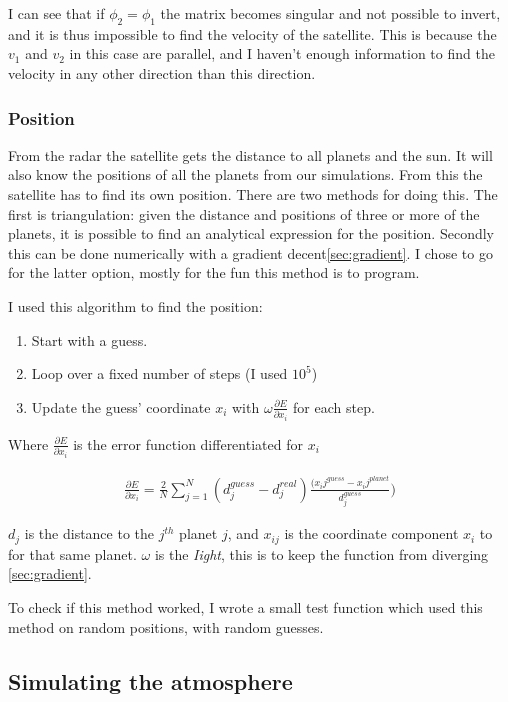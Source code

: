 \documentclass[a4paper, 10pt]{article}
\begin{document}
I can see that if $\phi_2 = \phi_1$ the matrix becomes singular and not possible to invert, and it is thus impossible to find the velocity of the satellite. This is because the $v_1$ and $v_2$ in this case are parallel, and I haven't enough information to find the velocity in any other direction than this direction.


\subsubsection{Position}
From the radar the satellite gets the distance to all planets and the sun. It will also know the positions of all the planets from our simulations. From this the satellite has to find its own position. There are two methods for doing this. The first is triangulation: given the distance and positions of three or more of the planets, it is possible to find an analytical expression for the position. Secondly this can be done numerically with a gradient decent\ref{sec:gradient}. I chose to go for the latter option, mostly for the fun this method is to program.

I used this algorithm to find the position:

\begin{enumerate}
\item Start with a guess.
\item Loop over a fixed number of steps (I used $10^{5}$)
\item Update the guess' coordinate $x_i$ with $\omega \frac{\partial E}{\partial x_i}$ for each step.
\end{enumerate}

Where $\frac{\partial E}{\partial x_i}$ is the error function differentiated for $x_i$

\begin{align}\label{eq:gradient}
\frac{\partial E}{\partial x_i} = \frac{2}{N}\sum_{j=1}^N (d_j^{guess} - d_j^{real})\frac{(x_ij^{guess} - x_ij^{planet}}{d_j^{guess}})
\end{align}

$d_j$ is the distance to the $j^{th}$ planet $j$, and $x_{ij}$ is the coordinate component $x_i$ to for that same planet. $\omega$ is the \textit{Iight}, this is to keep the function from diverging \ref{sec:gradient}.

To check if this method worked, I wrote a small test function which used this method on random positions, with random guesses.




\subsection{Simulating the atmosphere}
\end{document}
